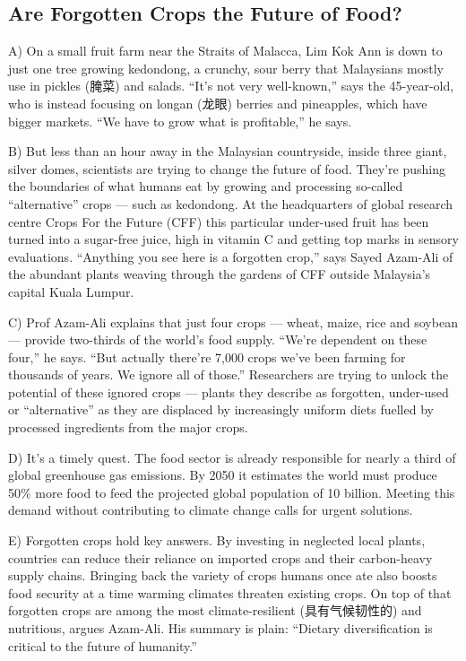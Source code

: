 \documentclass[UTF8,11pt]{ctexart}
\begin{document}
\subsection*{\textbf{Are Forgotten Crops the Future of Food?}}


A) On a small fruit farm near the Straits of Malacca, Lim Kok Ann is down to just one tree growing kedondong, a crunchy, sour berry that Malaysians mostly use in pickles (腌菜) and salads. “It’s not very well-known,” says the 45-year-old, who is instead focusing on longan (龙眼) berries and pineapples, which have bigger markets. “We have to grow what is profitable,” he says.


B) But less than an hour away in the Malaysian countryside, inside three giant, silver domes, scientists are trying to change the future of food. They’re pushing the boundaries of what humans eat by growing and processing so-called “alternative” crops — such as kedondong. At the headquarters of global research centre Crops For the Future (CFF) this particular under-used fruit has been turned into a sugar-free juice, high in vitamin C and getting top marks in sensory evaluations. “Anything you see here is a forgotten crop,” says Sayed Azam-Ali of the abundant plants weaving through the gardens of CFF outside Malaysia’s capital Kuala Lumpur.


C) Prof Azam-Ali explains that just four crops — wheat, maize, rice and soybean — provide two-thirds of the world’s food supply. “We’re dependent on these four,” he says. “But actually there’re 7,000 crops we’ve been farming for thousands of years. We ignore all of those.” Researchers are trying to unlock the potential of these ignored crops — plants they describe as forgotten, under-used or “alternative” as they are displaced by increasingly uniform diets fuelled by processed ingredients from the major crops.


D) It’s a timely quest. The food sector is already responsible for nearly a third of global greenhouse gas emissions. By 2050 it estimates the world must produce 50\% more food to feed the projected global population of 10 billion. Meeting this demand without contributing to climate change calls for urgent solutions.


E) Forgotten crops hold key answers. By investing in neglected local plants, countries can reduce their reliance on imported crops and their carbon-heavy supply chains. Bringing back the variety of crops humans once ate also boosts food security at a time warming climates threaten existing crops. On top of that forgotten crops are among the most climate-resilient (具有气候韧性的) and nutritious, argues Azam-Ali. His summary is plain: “Dietary diversification is critical to the future of humanity.”
\end{document}
